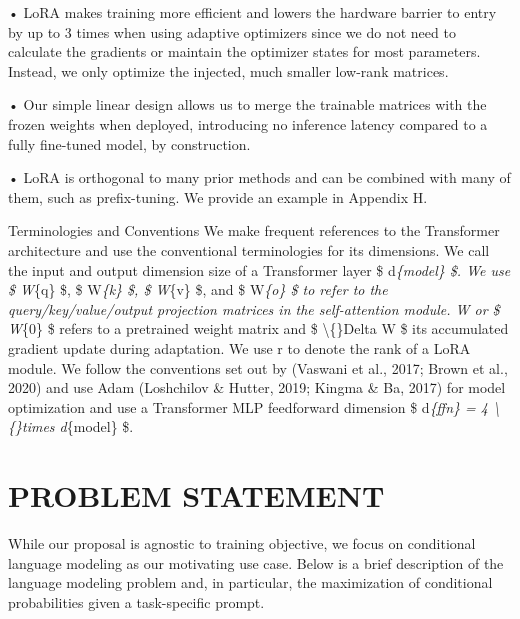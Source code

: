 \documentclass[conference]{IEEEtran}
\begin{document}
• LoRA makes training more efficient and lowers the hardware barrier to entry by up to 3 times when using adaptive optimizers since we do not need to calculate the gradients or maintain the optimizer states for most parameters. Instead, we only optimize the injected, much smaller low-rank matrices.

• Our simple linear design allows us to merge the trainable matrices with the frozen weights when deployed, introducing no inference latency compared to a fully fine-tuned model, by construction.

• LoRA is orthogonal to many prior methods and can be combined with many of them, such as prefix-tuning. We provide an example in Appendix H.

Terminologies and Conventions We make frequent references to the Transformer architecture and use the conventional terminologies for its dimensions. We call the input and output dimension size of a Transformer layer  \$ d\textit{\{model\} \$. We use  \$ W}\{q\} \$,  \$ W\textit{\{k\} \$,  \$ W}\{v\} \$, and  \$ W\textit{\{o\} \$ to refer to the query/key/value/output projection matrices in the self-attention module. W or  \$ W}\{0\} \$ refers to a pretrained weight matrix and  \$ \textbackslash\{\}Delta W \$ its accumulated gradient update during adaptation. We use r to denote the rank of a LoRA module. We follow the conventions set out by (Vaswani et al., 2017; Brown et al., 2020) and use Adam (Loshchilov \& Hutter, 2019; Kingma \& Ba, 2017) for model optimization and use a Transformer MLP feedforward dimension  \$ d\textit{\{ffn\} = 4 \textbackslash\{\}times d}\{model\} \$.




\section{PROBLEM STATEMENT}

While our proposal is agnostic to training objective, we focus on conditional language modeling as our motivating use case. Below is a brief description of the language modeling problem and, in particular, the maximization of conditional probabilities given a task-specific prompt.
\end{document}
